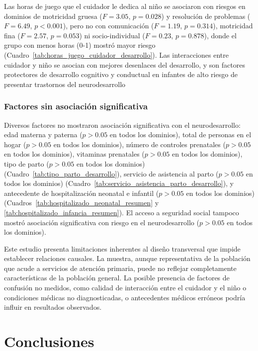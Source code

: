 \documentclass[11pt,letterpaper]{report}
\begin{document}
Las horas de juego que el cuidador le dedica al niño se asociaron con riesgos en
dominios de motricidad gruesa ($F = 3.05$, $p = 0.028$) y resolución de
problemas ($F = 6.49$, $p < 0.001$), pero no con comunicación ($F = 1.19$,
$p = 0.314$), motricidad fina ($F = 2.57$, $p = 0.053$) ni socio-individual
($F = 0.23$, $p = 0.878$), donde el grupo con menos horas (0-1) mostró mayor
riesgo (Cuadro~\ref{tab:horas_juego_cuidador_desarrollo}). Las interacciones entre cuidador y niño se asocian con mejores desenlaces del desarrollo, y son factores protectores de desarrollo cognitivo y conductual en infantes de alto riesgo de presentar trastornos del neurodesarrollo \cite{Jaffee2007,Isaev2023,Schneider2022}

\subsection{Factores sin asociación significativa}

Diversos factores no mostraron asociación significativa con el neurodesarrollo: 
edad materna y paterna ($p > 0.05$ en todos los dominios), total de personas en
el hogar ($p > 0.05$ en todos los dominios), número de controles prenatales
($p > 0.05$ en todos los dominios), vitaminas prenatales 
($p > 0.05$ en todos los dominios), 
tipo de parto ($p > 0.05$ en todos los dominios) 
(Cuadro~\ref{tab:tipo_parto_desarrollo}), servicio de asistencia al parto 
($p > 0.05$ en todos los dominios) 
(Cuadro~\ref{tab:servicio_asistencia_parto_desarrollo}), y antecedente de
hospitalización neonatal e infantil ($p > 0.05$ en todos los dominios) 
(Cuadros~\ref{tab:hospitalizado_neonatal_resumen} y 
\ref{tab:hospitalizado_infancia_resumen}). El acceso a seguridad social tampoco
mostró asociación significativa con riesgo en el neurodesarrollo ($p > 0.05$ en
todos los dominios). 

Este estudio presenta limitaciones inherentes al diseño transversal que impide 
establecer relaciones causales. La muestra, aunque representativa de la
población que acude a servicios de atención primaria, puede no reflejar
completamente características de la población general. La posible presencia de
factores de confusión no medidos, como calidad de interacción entre el cuidador
y el niño o condiciones médicas no diagnosticadas, o antecedentes médicos
erróneos podría influir en resultados observados.

\newpage

\chapter{Conclusiones}
\end{document}
